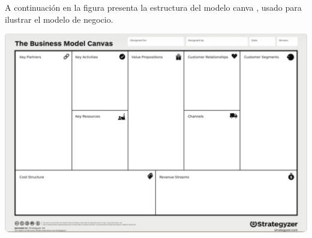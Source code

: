 A continuación en la figura %
presenta la estructura del modelo canva , usado para ilustrar el modelo de negocio.
\begin{adjustbox}{
    center,
    caption=[{Modelo Canva}]{\centering Modelo Canva. Fuente:(Sitio web: Modelo de negocio Canvas: Qué es y cómo usarlo, según Ylse Roa, 2023)},
    label={plantillaModeloCanva},
    nofloat=figure}

    \includegraphics[scale=0.4]{Images/modelo canva plantilla.jpeg}

\end{adjustbox}